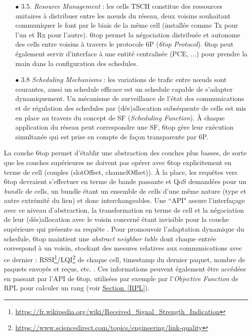 \documentclass[]{report}
\newcommand{\wordlink}[2]{\hyperref[#2]{#1~\ref{#2}}}
\begin{document}
\vspace{0.2cm}

\begin{itemize}
\item[$\bullet$] 3.5. \textit{Resource Management} : les cells TSCH constitue des ressources unitaires à distribuer entre les nœuds du réseau, deux voisins souhaitant communiquer le font par le biais de la même cell (installée comme Tx pour l'un et Rx pour l'autre). 6top permet la négociation distribuée et autonome des cells entre voisins à travers le protocole 6P (\textit{6top Protocol}). 6top peut également servir d'interface à une entité centralisée (PCE, ...) pour prendre la main dans la configuration des schedules.
\vspace{0.2cm}
\item[$\bullet$] 3.8 \textit{Scheduling Mechanisms} : les variations de trafic entre nœuds sont courantes, aussi un schedule efficace est un schedule capable de s'adapter dynamiquement. Un mécanisme de surveillance de l'état des communications et de régulation des schedules par (dés)allocation subséquente de cells est mis en place au travers du concept de SF (\textit{Scheduling Function}). À chaque application du réseau peut correspondre une SF, 6top gère leur exécution simultanée qui est prise en compte de façon transparente par 6P.
\end{itemize}

\vspace{0.6cm}

\par La couche 6top permet d'établir une abstraction des couches plus basses, de sorte que les couches supérieures ne doivent pas opérer avec 6top explicitement en terme de cell (couples (slotOffset, channelOffset)). À la place, les requêtes vers 6top devraient s'effectuer en terme de bande passante et QoS demandées pour un \textit{bundle} de cells, un bundle étant un ensemble de cells d'une même nature (type et autre extrémité du lien) et donc interchangeables. Une ``API" assure l'interfaçage avec ce niveau d'abstraction, la transformation en terme de cell et la négociation de leur (dés)allocation avec le voisin concerné étant invisible pour la couche supérieure qui présente sa requête \cite{ietf-6tisch-architecture-28}. Pour promouvoir l'adaptation dynamique du schedule, 6top maintient une \textit{abstract neighbor table} dont chaque entrée correspond à un voisin, stockant des mesures relatives aux communications avec ce dernier : RSSI\footnote{\url{https://fr.wikipedia.org/wiki/Received_Signal_Strength_Indication}}/LQI\footnote{\url{https://www.sciencedirect.com/topics/engineering/link-quality}} de chaque cell, timestamp du dernier paquet, nombre de paquets envoyés et reçus, etc. \cite{ietf-6tisch-architecture-28}. Ces informations peuvent également être accédées en passant par l'API de 6top, utilisées par exemple par l'\textit{Objective Function} de RPL pour calculer un rang (voir \wordlink{Section}{RPL}).\\
\end{document}
